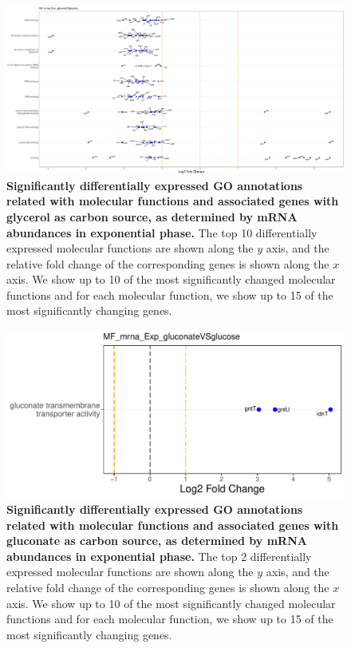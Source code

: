 \documentclass[a4paper]{article}
\begin{document}
\begin{figure}[!htb]
	\includegraphics[width=1.0\textwidth]{../../d_figures/MF01_mrna_Exp_glycerolVSglucose_withTitle.pdf}
	\caption[Significantly differentially expressed GO annotations associated with molecular functions for mRNA samples in exponential phase tested for glycerol against glucose]
	{\textbf{Significantly differentially expressed GO annotations related with molecular functions and associated genes with glycerol as carbon source, as determined by mRNA abundances in exponential phase.} The top 10 differentially expressed molecular functions are shown along the $y$ axis, and the relative fold change of the corresponding genes is shown along the $x$ axis. We show up to 10 of the most significantly changed molecular functions and for each molecular function, we show up to 15 of the most significantly changing genes.}
\end{figure}


\begin{figure}[!htb]
	\includegraphics[width=1.0\textwidth]{../../d_figures/MF02_mrna_Exp_gluconateVSglucose_withTitle.pdf}
	\caption[Significantly differentially expressed GO annotations associated with molecular functions for mRNA samples in exponential phase tested for gluconate against glucose]
	{\textbf{Significantly differentially expressed GO annotations related with molecular functions and associated genes with gluconate as carbon source, as determined by mRNA abundances in exponential phase.} The top 2 differentially expressed molecular functions are shown along the $y$ axis, and the relative fold change of the corresponding genes is shown along the $x$ axis. We show up to 10 of the most significantly changed molecular functions and for each molecular function, we show up to 15 of the most significantly changing genes.}
\end{figure}
\end{document}
